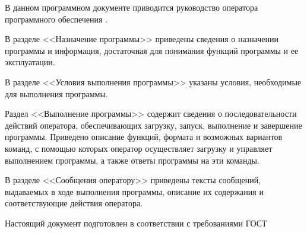 \newpage\annotation

В данном программном документе приводится руководство оператора программного обеспечения \programname.

В разделе <<Назначение программы>> приведены сведения о назначении программы и информация, достаточная для понимания функций программы и ее эксплуатации.

В разделе <<Условия выполнения программы>> указаны условия, необходимые для выполнения программы.

Раздел <<Выполнение программы>> содержит сведения о последовательности действий оператора, обеспечивающих загрузку, запуск, выполнение и завершение программы. Приведено описание функций, формата и возможных вариантов команд, с помощью которых оператор осуществляет загрузку и управляет выполнением программы, а также ответы программы на эти команды.

В разделе <<Сообщения оператору>> приведены тексты сообщений, выдаваемых в ходе выполнения программы, описание их содержания и соответствующие действия оператора.

Настоящий документ подготовлен в соответствии с требованиями ГОСТ~\cite{gost19505}
